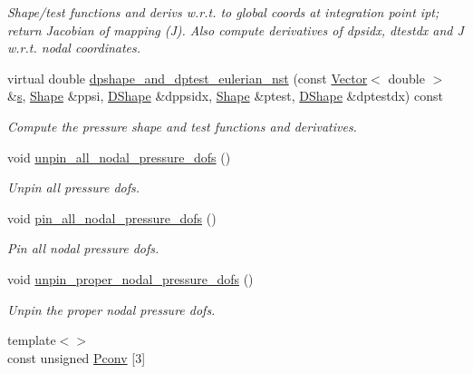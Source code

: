 \begin{DoxyCompactItemize}
\begin{DoxyCompactList}\small\item\em Shape/test functions and derivs w.\+r.\+t. to global coords at integration point ipt; return Jacobian of mapping (J). Also compute derivatives of dpsidx, dtestdx and J w.\+r.\+t. nodal coordinates. \end{DoxyCompactList}\item 
virtual double \hyperlink{classoomph_1_1TTaylorHoodElement_a85a25696971d271d8e2fd407b7b593d7}{dpshape\+\_\+and\+\_\+dptest\+\_\+eulerian\+\_\+nst} (const \hyperlink{classoomph_1_1Vector}{Vector}$<$ double $>$ \&\hyperlink{cfortran_8h_ab7123126e4885ef647dd9c6e3807a21c}{s}, \hyperlink{classoomph_1_1Shape}{Shape} \&ppsi, \hyperlink{classoomph_1_1DShape}{D\+Shape} \&dppsidx, \hyperlink{classoomph_1_1Shape}{Shape} \&ptest, \hyperlink{classoomph_1_1DShape}{D\+Shape} \&dptestdx) const
\begin{DoxyCompactList}\small\item\em Compute the pressure shape and test functions and derivatives. \end{DoxyCompactList}\item 
void \hyperlink{classoomph_1_1TTaylorHoodElement_a3c82a2ad750904e97a90e8e0fbe8e3c8}{unpin\+\_\+all\+\_\+nodal\+\_\+pressure\+\_\+dofs} ()
\begin{DoxyCompactList}\small\item\em Unpin all pressure dofs. \end{DoxyCompactList}\item 
void \hyperlink{classoomph_1_1TTaylorHoodElement_a07845585c278b8bfd1a919e0cfe9e8ef}{pin\+\_\+all\+\_\+nodal\+\_\+pressure\+\_\+dofs} ()
\begin{DoxyCompactList}\small\item\em Pin all nodal pressure dofs. \end{DoxyCompactList}\item 
void \hyperlink{classoomph_1_1TTaylorHoodElement_a3472c28aa1ce10f4a2cb754b78681b3f}{unpin\+\_\+proper\+\_\+nodal\+\_\+pressure\+\_\+dofs} ()
\begin{DoxyCompactList}\small\item\em Unpin the proper nodal pressure dofs. \end{DoxyCompactList}\item 
{\footnotesize template$<$$>$ }\\const unsigned \hyperlink{classoomph_1_1TTaylorHoodElement_ad11f3df045a9c8ecad05f1741d46caa4}{Pconv} \mbox{[}3\mbox{]}
\item 

\end{DoxyCompactItemize}
